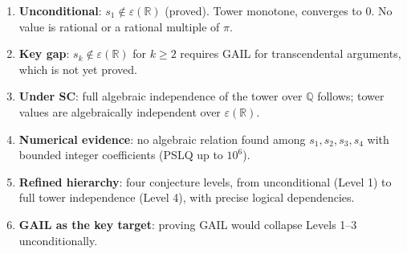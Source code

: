 \documentclass[11pt]{article}
\begin{document}
\begin{enumerate}
  \item \textbf{Unconditional}: $s_1\notin\varepsilon(\mathbb{R})$ (proved). Tower monotone, converges to 0. No value is rational or a rational multiple of $\pi$.
  \item \textbf{Key gap}: $s_k\notin\varepsilon(\mathbb{R})$ for $k\geq2$ requires GAIL for transcendental arguments, which is not yet proved.
  \item \textbf{Under SC}: full algebraic independence of the tower over $\mathbb{Q}$ follows; tower values are algebraically independent over $\varepsilon(\mathbb{R})$.
  \item \textbf{Numerical evidence}: no algebraic relation found among $s_1,s_2,s_3,s_4$ with bounded integer coefficients (PSLQ up to $10^6$).
  \item \textbf{Refined hierarchy}: four conjecture levels, from unconditional (Level 1) to full tower independence (Level 4), with precise logical dependencies.
  \item \textbf{GAIL as the key target}: proving GAIL would collapse Levels 1--3 unconditionally.
\end{enumerate}
\end{document}
